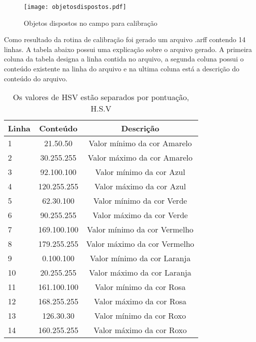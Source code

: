 	\begin{figure}[H]
\centering
\texttt{[image: objetosdispostos.pdf]}
\caption{Objetos dispostos no campo para calibração}
\label{fig:objetodispostos}
\end{figure}	
	
Como resultado da rotina de calibração foi gerado um arquivo .arff contendo 14 linhas. A tabela abaixo possui uma explicação sobre o arquivo gerado. A primeira coluna da tabela designa a linha contida no arquivo, a segunda coluna possui o conteúdo existente na linha do arquivo e na ultima coluna está a descrição do conteúdo do arquivo.
	\begin{table}[H]
\centering 
\begin{tabular}{l|c|c}
Linha & Conteúdo & Descrição  \\%
\hline                               %
 1& 21.50.50  &   Valor mínimo da cor Amarelo \\ \hline  
2& 30.255.255  &  Valor máximo da cor Amarelo \\  \hline 
3& 92.100.100  &   Valor mínimo da cor Azul \\  \hline 
4& 120.255.255  &  Valor máximo da cor  Azul \\  \hline 
5& 62.30.100 &  Valor mínimo da cor Verde \\  \hline 
6& 90.255.255  &  Valor máximo da cor Verde \\  \hline 
7& 169.100.100  &  Valor mínimo da cor Vermelho \\  \hline 
8& 179.255.255  &  Valor máximo da cor Vermelho \\   \hline 
9& 0.100.100  &  Valor mínimo da cor Laranja \\  \hline 
10& 20.255.255 &  Valor máximo da cor  Laranja \\  \hline 
11& 161.100.100 &  Valor mínimo da cor Rosa \\  \hline 
12& 168.255.255 &   Valor máximo da cor Rosa \\  \hline 
13& 126.30.30 &  Valor mínimo da cor Roxo \\  \hline 
14& 160.255.255 &  Valor máximo da cor Roxo \\  \hline 

\end{tabular}
\caption{Os valores de HSV estão separados por pontuação, H.S.V}
\end{table}





